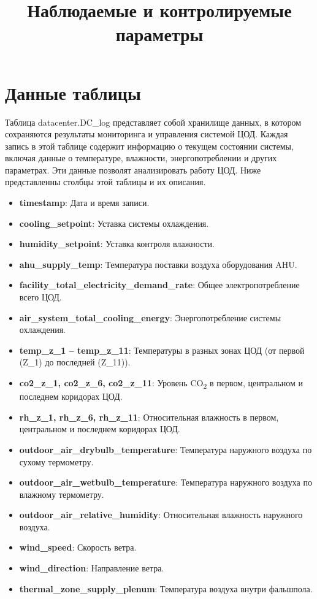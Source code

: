\documentclass{article}
\title{Наблюдаемые и контролируемые параметры}
\date{}
\begin{document}
\maketitle

\section*{Данные таблицы}
Таблица datacenter.DC\_log представляет собой хранилище данных, в котором сохраняются результаты мониторинга и управления системой ЦОД. Каждая запись в этой таблице содержит информацию о текущем состоянии системы, включая данные о температуре, влажности, энергопотреблении и других параметрах. Эти данные позволят анализировать работу ЦОД. Ниже представленны столбцы этой таблицы и их описания.


\begin{itemize}
    \item \textbf{timestamp}: Дата и время записи.
    \item \textbf{cooling\_setpoint}: Уставка системы охлаждения.
    \item \textbf{humidity\_setpoint}: Уставка контроля влажности.
    \item \textbf{ahu\_supply\_temp}: Температура поставки воздуха оборудования AHU.
    \item \textbf{facility\_total\_electricity\_demand\_rate}: Общее электропотребление всего ЦОД.
    \item \textbf{air\_system\_total\_cooling\_energy}: Энергопотребление системы охлаждения.
    \item \textbf{temp\_z\_1 -- temp\_z\_11}: Температуры в разных зонах ЦОД (от первой (Z\_1) до последней (Z\_11)).
    \item \textbf{co2\_z\_1, co2\_z\_6, co2\_z\_11}: Уровень CO\textsubscript{2} в первом, центральном и последнем коридорах ЦОД.
    \item \textbf{rh\_z\_1, rh\_z\_6, rh\_z\_11}: Относительная влажность в первом, центральном и последнем коридорах ЦОД.
    \item \textbf{outdoor\_air\_drybulb\_temperature}: Температура наружного воздуха по сухому термометру.
    \item \textbf{outdoor\_air\_wetbulb\_temperature}: Температура наружного воздуха по влажному термометру.
    \item \textbf{outdoor\_air\_relative\_humidity}: Относительная влажность наружного воздуха.
    \item \textbf{wind\_speed}: Скорость ветра.
    \item \textbf{wind\_direction}: Направление ветра.
    \item \textbf{thermal\_zone\_supply\_plenum}: Температура воздуха внутри фальшпола.
\end{itemize}
\end{document}

